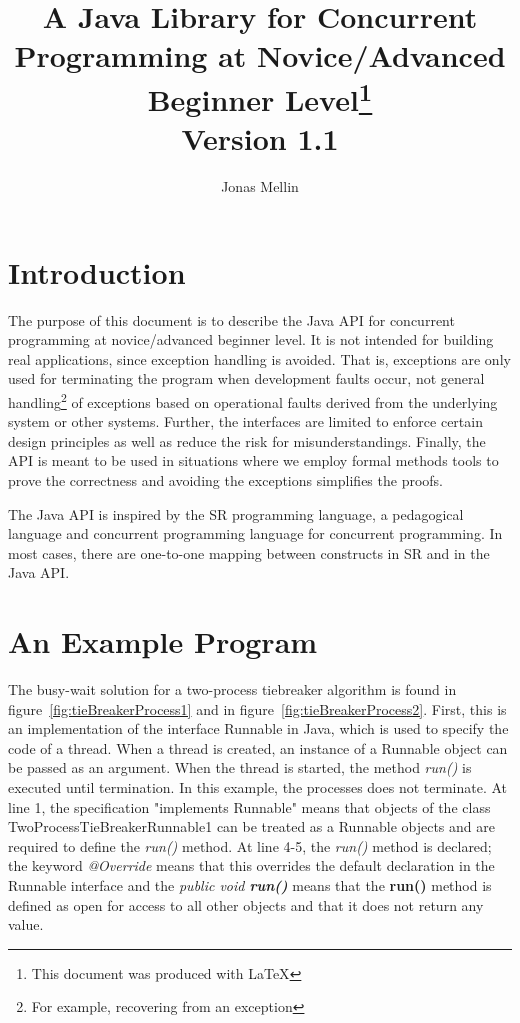 \documentclass[11pt]{article} %
\title{A Java Library for Concurrent Programming at Novice/Advanced Beginner Level\thanks{This document was produced with \LaTeX}\\Version 1.1}
\author{Jonas Mellin}
\begin{document}
\maketitle

\section{Introduction}

The purpose of this document is to describe the Java API for concurrent programming at novice/advanced beginner level. It is not intended for building real applications, since exception handling is avoided. That is, exceptions are only used for terminating the program when development faults occur, not general handling\footnote{For example, recovering from an exception} of exceptions based on operational faults derived from the underlying system or other systems. Further, the interfaces are limited to enforce certain design principles as well as reduce the risk for misunderstandings. Finally, the API is meant to be used in situations where we employ formal methods tools to prove the correctness and avoiding the exceptions simplifies the proofs.

The Java API is inspired by the SR programming language, a pedagogical language and concurrent programming language for concurrent programming. In most cases, there are one-to-one mapping between constructs in SR and in the Java API. 



\section{An Example Program}

The busy-wait solution for a two-process tiebreaker algorithm is found in figure~\ref{fig:tieBreakerProcess1} and in figure~\ref{fig:tieBreakerProcess2}. First, this is an implementation of the interface Runnable in Java, which is used to specify the code of a thread. When a thread is created, an instance of a Runnable object can be passed as an argument. When the thread is started, the method \emph{ run()} is executed until termination. In this example, the processes does not terminate. At line 1, the specification "implements Runnable" means that objects of the class TwoProcessTieBreakerRunnable1 can be treated as a Runnable objects and are required to define the \emph{ run()} method. At line 4-5, the \emph{ run()} method is declared; the keyword \emph{@Override} means that this overrides the default declaration in the Runnable interface and the \emph{public  void {\bfseries run()}} means that the {\bfseries run()} method is defined as open for access to all other objects and that it does not return any value. 
\end{document}
